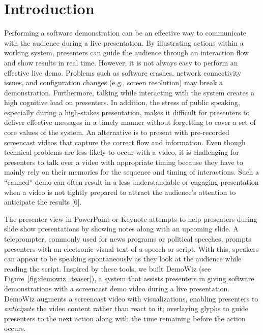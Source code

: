 \section{Introduction}

Performing a software demonstration can be an effective way to communicate with the audience during a live presentation. By illustrating actions within a working system, presenters can guide the audience through an interaction flow and show results in real time. However, it is not always easy to perform an effective live demo. Problems such as software crashes, network connectivity issues, and configuration changes (e.g., screen resolution) may break a demonstration. Furthermore, talking while interacting with the system creates a high cognitive load on presenters. In addition, the stress of public speaking, especially during a high-stakes presentation, makes it difficult for presenters to deliver effective messages in a timely manner without forgetting to cover a set of core values of the system. An alternative is to present with pre-recorded screencast videos that capture the correct flow and information. Even though technical problems are less likely to occur with a video, it is challenging for presenters to talk over a video with appropriate timing because they have to mainly rely on their memories for the sequence and timing of interactions. Such a “canned” demo can often result in a less understandable or engaging presentation when a video is not tightly prepared to attract the audience's attention to anticipate the results [6].

The presenter view in PowerPoint or Keynote attempts to help presenters during slide show presentations by showing notes along with an upcoming slide. A teleprompter, commonly used for news programs or political speeches, prompts presenters with an electronic visual text of a speech or script. With this, speakers can appear to be speaking spontaneously as they look at the audience while reading the script. Inspired by these tools, we built DemoWiz (see Figure~\ref{fig:demowiz_teaser}), a system that assists presenters in giving software demonstrations with a screencast demo video during a live presentation. DemoWiz augments a screencast video with visualizations, enabling presenters to \textit{anticipate} the video content rather than react to it; overlaying glyphs to guide presenters to the next action along with the time remaining before the action occurs.

